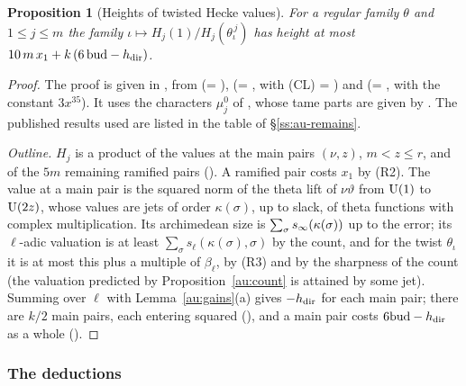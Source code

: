 \documentclass[10pt]{amsart}
\newtheorem{proposition}[theorem]{Proposition}
\theoremstyle{definition}
\theoremstyle{remark}
\begin{document}
\begin{proposition}[Heights of twisted Hecke values]\label{au:hecke}
For a regular family $\theta$ and $1\le j\le m$ the family $\iota\mapsto H_j(1)/H_j(\theta_\iota^
{\,j})$ has height at most $10\,m\,x_1+k\,(6\,\mathrm{bud}-h_{\mathrm{dir}})$.
\end{proposition}
\begin{proof}
The proof is given in {\cite[\S2.7]{P54}}, from {\cite[Proposition~2.23]{P54}} (= {\cite[Proposition~3.4]{P54}}), {\cite[Proposition~2.24]{P54}} (= {\cite[Theorem~7.43]{P54}}, with (CL) = {\cite[Theorem~9.1]{P53}}) and {\cite[Proposition~2.25]{P54}} (= {\cite[Theorem~7.40]{P54}}, with the constant $3x^{35}$). It uses the characters $\mu_j^0$ of {\cite[\S2.7]{P54}}, whose tame parts are given by {\cite[Proposition~6.15]{P54}}. The published results used are listed in the table of \S\ref{ss:au-remains}.

\emph{Outline.}
$H_j$ is a product of the values at the main pairs $(\nu,z)$, $m<z\le r$, and of the $5m$ remaining
ramified pairs ({\cite[Lemma~2.20]{P54}}). A ramified pair costs $x_1$ by (R2). The value at a main pair is the squared norm
of the theta lift of $\nu\vartheta$ from $\mathrm U(1)$ to $\mathrm U(2z)$, whose values are jets of order
$\kappa(\sigma)$, up to slack, of theta functions with complex multiplication. Its archimedean
size is $\sum_\sigma s_\infty(\kappa(\sigma))$ up to the error; its $\ell$-adic valuation is at
least $\sum_\sigma s_\ell(\kappa(\sigma),\sigma)$ by the count, and for the twist $\theta_\iota$
it is at most this plus a multiple of $\beta_\ell$, by (R3) and by the sharpness of the count (the valuation
predicted by Proposition~\ref{au:count} is attained by some jet). Summing over $\ell$ with
Lemma~\ref{au:gains}(a) gives $-h_{\mathrm{dir}}$ for each main pair; there are $k/2$ main pairs, each entering squared ({\cite[Lemma~2.20]{P54}}), and a main pair costs $6\mathrm{bud}-h_{\mathrm{dir}}$ as a whole ({\cite[Proposition~2.26]{P54}}).
\end{proof}

\subsubsection*{The deductions}
\end{document}
